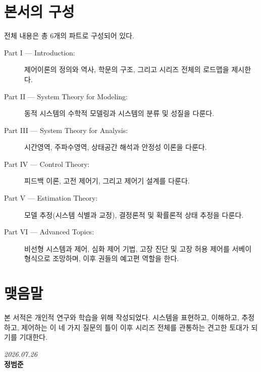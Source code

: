     \section*{본서의 구성}
        전체 내용은 총 6개의 파트로 구성되어 있다.

        \begin{description}
            \item[Part I --- Introduction:] 제어이론의 정의와 역사, 학문의 구조, 그리고 시리즈 전체의 로드맵을 제시한다.
            \item[Part II --- System Theory for Modeling:] 동적 시스템의 수학적 모델링과 시스템의 분류 및 성질을 다룬다.
            \item[Part III --- System Theory for Analysis:] 시간영역, 주파수영역, 상태공간 해석과 안정성 이론을 다룬다.
            \item[Part IV --- Control Theory:] 피드백 이론, 고전 제어기, 그리고 제어기 설계를 다룬다.
            \item[Part V --- Estimation Theory:] 모델 추정(시스템 식별과 교정), 결정론적 및 확률론적 상태 추정을 다룬다.
            \item[Part VI --- Advanced Topics:] 비선형 시스템과 제어, 심화 제어 기법, 고장 진단 및 고장 허용 제어를 서베이 형식으로 조망하며, 이후 권들의 예고편 역할을 한다.
        \end{description}

    \section*{맺음말}
        본 서적은 개인적 연구와 학습을 위해 작성되었다. 시스템을 표현하고, 이해하고, 추정하고, 제어하는 이 네 가지 질문의 틀이 이후 시리즈 전체를 관통하는 견고한 토대가 되기를 기대한다.

    \vspace{1.5em}

    \begin{flushright}
        \textit{2026.07.26}\\
        \textbf{정범준}
    \end{flushright}